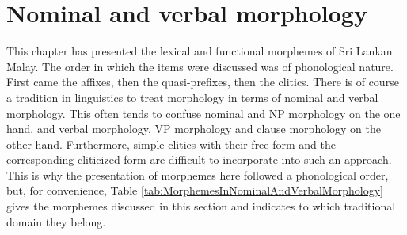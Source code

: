 \section{Nominal and verbal morphology}\label{sec:morph:Nominalandverbalmorphology}
This chapter has presented the lexical and functional morphemes of Sri Lankan Malay. The order in which the items were discussed was of phonological nature. First came the affixes, then the quasi-prefixes, then the clitics. There is of course a tradition in linguistics to treat morphology in terms of nominal and verbal morphology. This often tends to confuse nominal and NP morphology on the one hand, and verbal morphology, VP morphology and clause morphology on the other hand. Furthermore, simple clitics with their free form and the corresponding cliticized form are difficult to incorporate into such an approach. This is why the presentation of morphemes here followed a phonological order, but, for convenience, Table \ref{tab:MorphemesInNominalAndVerbalMorphology} gives the morphemes discussed in this section and indicates to which traditional domain they belong.

